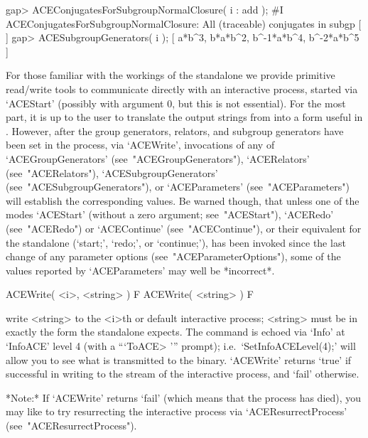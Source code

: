 \beginexample
gap> ACEConjugatesForSubgroupNormalClosure( i : add );
#I  ACEConjugatesForSubgroupNormalClosure: All (traceable) conjugates in subgp
[  ]
gap> ACESubgroupGenerators( i );
[ a*b^3, b*a*b^2, b^-1*a*b^4, b^-2*a*b^5 ]

\endexample


For those familiar with the  workings  of  the  {\ACE}  standalone  we
provide primitive read/write tools to  communicate  directly  with  an
interactive {\ACE} process,  started  via  `ACEStart'  (possibly  with
argument 0, but this is not essential). For the most part, it is up to
the user to translate the output  strings  from  {\ACE}  into  a  form
useful in {\GAP}. However, after the group generators,  relators,  and
subgroup  generators  have  been  set  in  the  {\ACE}  process,   via
`ACEWrite',    invocations    of    any    of     `ACEGroupGenerators'
(see~"ACEGroupGenerators"),     `ACERelators'     (see~"ACERelators"),
`ACESubgroupGenerators'       (see~"ACESubgroupGenerators"),        or
`ACEParameters' (see~"ACEParameters") will establish the corresponding
{\GAP} values.  Be  warned  though,  that  unless  one  of  the  modes
`ACEStart'  (without  a  zero  argument;  see~"ACEStart"),   `ACERedo'
(see~"ACERedo")  or  `ACEContinue'   (see~"ACEContinue"),   or   their
equivalent  for  the  standalone   {\ACE}   (`start;',   `redo;',   or
`continue;'), has been invoked since the last change of any  parameter
options (see~"ACEParameterOptions"), some of the  values  reported  by
`ACEParameters' may well be *incorrect*.

\>ACEWrite( <i>, <string> ) F
\>ACEWrite( <string> ) F

write <string> to the <i>th or  default  interactive  {\ACE}  process;
<string> must be in exactly the form the  {\ACE}  standalone  expects.
The command is  echoed  via  `Info'  at  `InfoACE'  level  4  (with  a
```ToACE> ''' prompt); i.e.~`SetInfoACELevel(4);'  will  allow  you to
see what is transmitted to the {\ACE} binary. `ACEWrite' returns `true'
if successful in writing to the stream of the interactive {\ACE} process,
and `fail' otherwise.

*Note:*
If `ACEWrite' returns `fail' (which means that the {\ACE} process  has
died), you may like to try resurrecting the interactive {\ACE} process
via `ACEResurrectProcess' (see~"ACEResurrectProcess").

